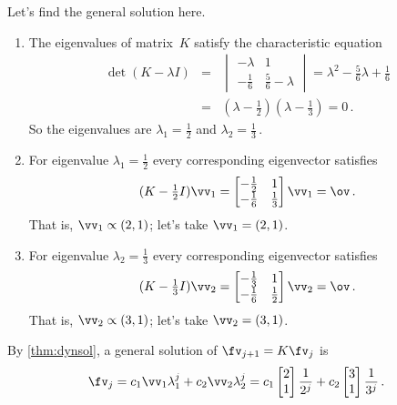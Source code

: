 \begin{example}
\begin{solution}
\begin{enumerate}
Let's find the general solution here.
\begin{enumerate}
\item The eigenvalues of matrix~\(K\) satisfy the characteristic equation
\begin{eqnarray*}
\det(K-\lambda I)&=&\begin{vmatrix} -\lambda&1\\-\frac16& \frac56-\lambda\end{vmatrix}
=\lambda^2-\tfrac56\lambda+\tfrac16
\\&
=&(\lambda-\tfrac12)(\lambda-\tfrac13)
=0\,.
\end{eqnarray*}
So the eigenvalues are \(\lambda_1=\tfrac12\) and \(\lambda_2=\tfrac13\)\,.
\item For eigenvalue \(\lambda_1=\tfrac12\) every corresponding eigenvector satisfies
\begin{equation*}
(K-\tfrac12I)\vv_1=\begin{bmatrix} -\frac12&1\\-\frac16&\frac13 \end{bmatrix}\vv_1=\ov\,.
\end{equation*}
That is, \(\vv_1\propto (2,1)\); let's take \(\vv_1=(2,1)\).
\item For eigenvalue \(\lambda_2=\tfrac13\) every corresponding eigenvector satisfies
\begin{equation*}
(K-\tfrac13I)\vv_2=\begin{bmatrix} -\frac13&1\\-\frac16&\frac12 \end{bmatrix}\vv_2=\ov\,.
\end{equation*}
That is, \(\vv_2\propto (3,1)\); let's take \(\vv_2=(3,1)\).
\end{enumerate}
By \autoref{thm:dynsol}, a general solution of \(\fv_{j+1}=K\fv_j\) is 
\begin{equation*}
\fv_j=c_1\vv_1\lambda_1^j+c_2\vv_2\lambda_2^j
=c_1\begin{bmatrix} 2\\1 \end{bmatrix}\frac1{2^j} +c_2\begin{bmatrix} 3\\1 \end{bmatrix}\frac1{3^j}\,.
\end{equation*}



\end{enumerate}
\end{solution}
\end{example}
